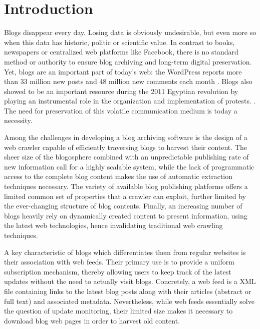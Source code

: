 \section{Introduction}

Blogs disappear every day. Losing data is obviously undesirable, but even more so when this data has historic, politic or scientific value. In contrast to books, newspapers or centralized web platforms like Facebook, there is no standard method or authority to ensure blog archiving and long-term digital preservation. Yet, blogs are an important part of today's web: the WordPress reports more than 33 million new posts and 48 million new comments each month \cite{wordpress2014}. Blogs also showed to be an important resource during the 2011 Egyptian revolution by playing an instrumental role in the organization and implementation of protests. \cite{nahedeltantawy2012}. The need for preservation of this volatile communication medium is today a necessity. 

Among the challenges in developing a blog archiving software is the design of a web crawler capable of efficiently traversing blogs to harvest their content. The sheer size of the blogosphere combined with an unpredictable publishing rate of new information call for a highly scalable system, while the lack of programmatic access to the complete blog content makes the use of automatic extraction techniques necessary. The variety of available blog publishing platforms offers a limited common set of properties that a crawler can exploit, further limited by the ever-changing structure of blog contents. Finally, an increasing number of blogs heavily rely on dynamically created content to present information, using the latest web technologies, hence invalidating traditional web crawling techniques.

A key characteristic of blogs which differentiates them from regular websites is their association with web feeds. Their primary use is to provide a uniform subscription mechanism, thereby allowing users to keep track of the latest updates without the need to actually visit blogs. Concretely, a web feed is a XML file containing links to the latest blog posts along with their articles (abstract or full text) and associated metadata. Nevertheless, while web feeds essentially solve the question of update monitoring, their limited size makes it necessary to download blog web pages in order to harvest old content.


